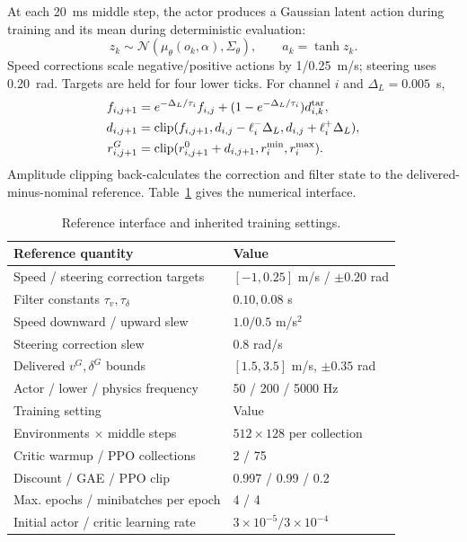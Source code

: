 \documentclass[journal]{IEEEtran}
\newcommand{\clip}{\operatorname{clip}}\newcommand{\sat}{\operatorname{sat}}
\begin{document}
At each 20~ms middle step, the actor produces a Gaussian latent action during training and its mean during deterministic evaluation:
\begin{equation}
 z_k\sim\mathcal N(\mu_\theta(o_k,\alpha),\Sigma_\theta),
 \qquad a_k=\tanh z_k.
 \label{eq:actor}
\end{equation}
Speed corrections scale negative/positive actions by 1/0.25~m/s; steering uses 0.20~rad. Targets are held for four lower ticks. For channel $i$ and $\Delta_L=0.005$~s,
\begin{align}
 f_{i,j+1}&=e^{-\Delta_L/\tau_i}f_{i,j}
 +(1-e^{-\Delta_L/\tau_i})d_{i,k}^{\rm tar},\nonumber\\
 d_{i,j+1}&=\clip(f_{i,j+1},d_{i,j}-\ell_i^-\Delta_L,
                         d_{i,j}+\ell_i^+\Delta_L),\nonumber\\
 r^G_{i,j+1}&=\clip(r^0_{i,j+1}+d_{i,j+1},r_i^{\min},r_i^{\max}).
 \label{eq:shaping}
\end{align}
Amplitude clipping back-calculates the correction and filter state to the delivered-minus-nominal reference. Table~\ref{tab:interface} gives the numerical interface.

\begin{table}[t]\centering\footnotesize
\caption{Reference interface and inherited training settings.}\label{tab:interface}
\begin{tabular}{@{}ll@{}}\toprule
Reference quantity & Value\\\midrule
Speed / steering correction targets & $[-1,0.25]$ m/s / $\pm0.20$ rad\\
Filter constants $\tau_v,\tau_\delta$ & $0.10,0.08$ s\\
Speed downward / upward slew & $1.0/0.5$ m/s$^2$\\
Steering correction slew & $0.8$ rad/s\\
Delivered $v^G,\delta^G$ bounds & $[1.5,3.5]$ m/s, $\pm0.35$ rad\\
Actor / lower / physics frequency & 50 / 200 / 5000 Hz\\\midrule
Training setting & Value\\\midrule
Environments $\times$ middle steps & $512\times128$ per collection\\
Critic warmup / PPO collections & 2 / 75\\
Discount / GAE / PPO clip & 0.997 / 0.99 / 0.2\\
Max. epochs / minibatches per epoch & 4 / 4\\
Initial actor / critic learning rate & $3\times10^{-5}/3\times10^{-4}$\\\bottomrule
\end{tabular}
\end{table}
\end{document}
